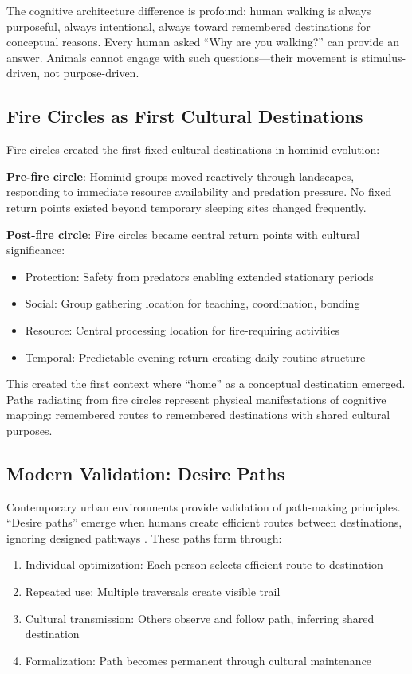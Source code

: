 The cognitive architecture difference is profound: human walking is always purposeful, always intentional, always toward remembered destinations for conceptual reasons. Every human asked ``Why are you walking?'' can provide an answer. Animals cannot engage with such questions—their movement is stimulus-driven, not purpose-driven.

\subsection{Fire Circles as First Cultural Destinations}

Fire circles created the first fixed cultural destinations in hominid evolution:

\textbf{Pre-fire circle}: Hominid groups moved reactively through landscapes, responding to immediate resource availability and predation pressure. No fixed return points existed beyond temporary sleeping sites changed frequently.

\textbf{Post-fire circle}: Fire circles became central return points with cultural significance:
\begin{itemize}
\item Protection: Safety from predators enabling extended stationary periods
\item Social: Group gathering location for teaching, coordination, bonding
\item Resource: Central processing location for fire-requiring activities
\item Temporal: Predictable evening return creating daily routine structure
\end{itemize}

This created the first context where ``home'' as a conceptual destination emerged. Paths radiating from fire circles represent physical manifestations of cognitive mapping: remembered routes to remembered destinations with shared cultural purposes.

\subsection{Modern Validation: Desire Paths}

Contemporary urban environments provide validation of path-making principles. ``Desire paths'' emerge when humans create efficient routes between destinations, ignoring designed pathways \citep{helbing1997modelling}. These paths form through:

\begin{enumerate}
\item Individual optimization: Each person selects efficient route to destination
\item Repeated use: Multiple traversals create visible trail
\item Cultural transmission: Others observe and follow path, inferring shared destination
\item Formalization: Path becomes permanent through cultural maintenance
\end{enumerate}

